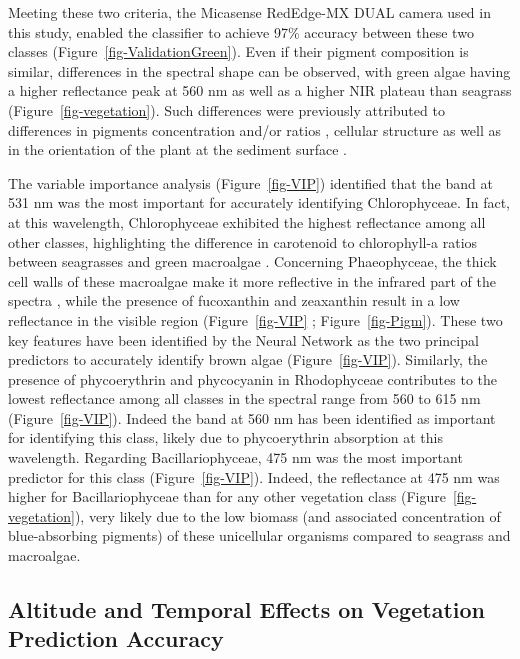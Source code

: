 \documentclass[
  number]{elsarticle}
\begin{document}
Meeting these two criteria, the Micasense RedEdge-MX DUAL camera used in
this study, enabled the classifier to achieve 97\% accuracy between
these two classes (Figure~\ref{fig-ValidationGreen}). Even if their
pigment composition is similar, differences in the spectral shape can be
observed, with green algae having a higher reflectance peak at 560 nm as
well as a higher NIR plateau than seagrass
(Figure~\ref{fig-vegetation}). Such differences were previously
attributed to differences in pigments concentration and/or ratios
\citep{bargain2013seasonal}, cellular structure as well as in the
orientation of the plant at the sediment surface
\citep{beach1997vivo, kirk1994light, hedley2018influence}.

The variable importance analysis (Figure~\ref{fig-VIP}) identified that
the band at 531 nm was the most important for accurately identifying
Chlorophyceae. In fact, at this wavelength, Chlorophyceae exhibited the
highest reflectance among all other classes, highlighting the difference
in carotenoid to chlorophyll-a ratios between seagrasses and green
macroalgae \citep{repolho2017seagrass}. Concerning Phaeophyceae, the
thick cell walls of these macroalgae \citep{charrier2021growth} make it
more reflective in the infrared part of the spectra \citep{Slaton2001},
while the presence of fucoxanthin and zeaxanthin result in a low
reflectance in the visible region (Figure~\ref{fig-VIP} ;
Figure~\ref{fig-Pigm}). These two key features have been identified by
the Neural Network as the two principal predictors to accurately
identify brown algae (Figure~\ref{fig-VIP}). Similarly, the presence of
phycoerythrin and phycocyanin in Rhodophyceae contributes to the lowest
reflectance among all classes in the spectral range from 560 to 615 nm
(Figure~\ref{fig-VIP}). Indeed the band at 560 nm has been identified as
important for identifying this class, likely due to phycoerythrin
absorption at this wavelength. Regarding Bacillariophyceae, 475 nm was
the most important predictor for this class (Figure~\ref{fig-VIP}).
Indeed, the reflectance at 475 nm was higher for Bacillariophyceae than
for any other vegetation class (Figure~\ref{fig-vegetation}), very
likely due to the low biomass (and associated concentration of
blue-absorbing pigments) of these unicellular organisms compared to
seagrass and macroalgae.

\subsection{Altitude and Temporal Effects on Vegetation Prediction
Accuracy}\label{altitude-and-temporal-effects-on-vegetation-prediction-accuracy}
\end{document}
